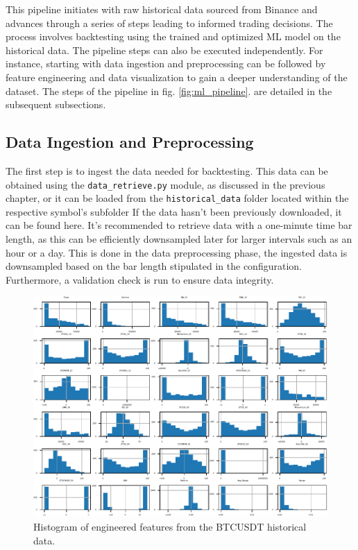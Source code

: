 This pipeline initiates with raw historical data sourced from Binance and advances through a series of steps
leading to informed trading decisions. The process involves backtesting using the trained and optimized ML model on the historical data.
The pipeline steps can also be executed independently.
For instance, starting with data ingestion and preprocessing can be followed by feature engineering and data visualization to gain a deeper understanding of the dataset. The steps of the pipeline in  fig. \ref{fig:ml_pipeline}. are detailed in the subsequent subsections.


\subsection{Data Ingestion and Preprocessing}
The first step is to ingest the data needed for backtesting. This data can be obtained using the \texttt{data_retrieve.py} module,
as discussed in the previous chapter, or it can be loaded from the \texttt{historical_data} folder located within the respective symbol's subfolder
If the data hasn't been previously downloaded, it can be found here. It's recommended to retrieve data with a one-minute time bar length,
as this can be efficiently downsampled later for larger intervals such as an hour or a day.
This is done in the data preprocessing phase, the ingested data is downsampled based on the bar length stipulated in the configuration. Furthermore, a validation check is run to ensure data integrity.

\begin{figure}[h]
\centering
\begin{adjustbox}{max width=1.15\textwidth,center}
    \includegraphics[scale=1.15]{./pdf/dataset_histogram.pdf}
\end{adjustbox}
\caption{Histogram of engineered features from the BTCUSDT historical data.}
\label{fig:dataset_histogram}
\end{figure}



